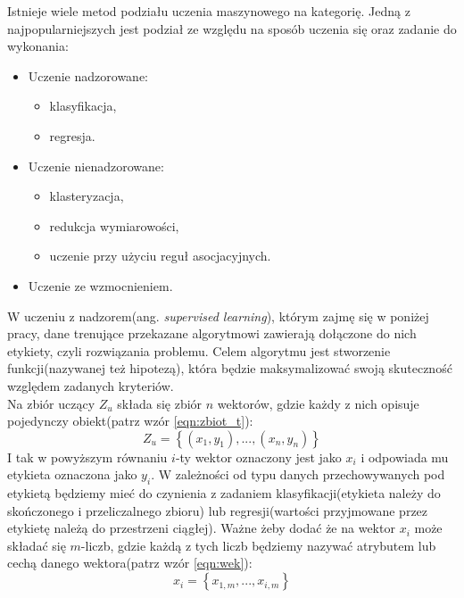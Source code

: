 Istnieje wiele metod podziału uczenia maszynowego na kategorię. Jedną z najpopularniejszych jest podział ze względu na sposób uczenia się oraz zadanie do wykonania\cite{python_ml}:
\begin{itemize}
	\item Uczenie nadzorowane:
	\begin{itemize}
		\item klasyfikacja,
		\item regresja.
	\end{itemize}
	\item Uczenie nienadzorowane:
	\begin{itemize}
		\item klasteryzacja,
		\item redukcja wymiarowości,
		\item uczenie przy użyciu reguł asocjacyjnych.
	\end{itemize}
	\item Uczenie ze wzmocnieniem.\\
\end{itemize}

W uczeniu z nadzorem(ang. \textit{supervised learning}), którym zajmę się w poniżej pracy, dane trenujące przekazane algorytmowi zawierają dołączone do nich etykiety, czyli rozwiązania problemu. Celem algorytmu jest stworzenie funkcji(nazywanej też hipotezą\cite{cichosz}), która będzie maksymalizować swoją skuteczność względem zadanych kryteriów.
\\

Na zbiór uczący $Z_{u}$ składa się zbiór $n$ wektorów, gdzie każdy z nich opisuje pojedynczy obiekt(patrz wzór \ref{eqn:zbiot_t}):
\begin{equation}
	Z_{u}=\left \{(x_{1},y_{1}),...,(x_{n},y_{n})\right \}
	\label{eqn:zbiot_t}
\end{equation}
I tak w powyższym równaniu $i$-ty wektor oznaczony jest jako $x_{i}$ i odpowiada mu etykieta oznaczona jako $y_{i}$. W zależności od typu danych przechowywanych pod etykietą będziemy mieć do czynienia z zadaniem klasyfikacji(etykieta należy do skończonego i przeliczalnego zbioru) lub regresji(wartości przyjmowane przez etykietę należą do przestrzeni ciągłej). Ważne żeby dodać że na wektor $x_{i}$ może składać się $m$-liczb, gdzie każdą z tych liczb będziemy nazywać atrybutem lub cechą danego wektora(patrz wzór \ref{eqn:wek}):
\begin{equation}
	x_{i} = \left \{ x_{1,m}, ..., x_{i,m} \right \}
	\label{eqn:wek}
\end{equation}

